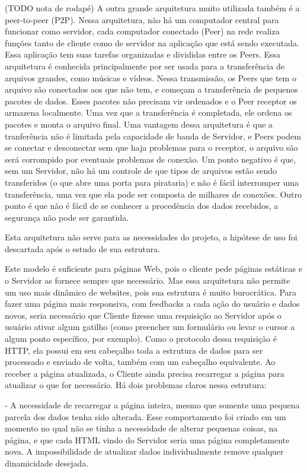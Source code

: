 \documentclass[a4paper,12pt]{article}
\begin{document}
(TODO nota de rodapé)
A outra grande arquitetura muito utilizada também é a peer-to-peer (P2P). Nessa arquitetura, não há um computador central para funcionar como servidor, cada computador conectado (Peer) na rede realiza funções tanto de cliente como de servidor na aplicação que está sendo executada. Essa aplicação tem suas tarefas organizadas e divididas entre os Peers.
Essa arquitetura é conhecida principalmente por ser usada para a transferência de arquivos grandes, como músicas e vídeos. Nessa transmissão, os Peers que tem o arquivo são conectados aos que não tem, e começam a transferência de pequenos pacotes de dados. Esses pacotes não precisam vir ordenados e o Peer receptor os armazena localmente. Uma vez que a transferência é completada, ele ordena os pacotes e monta o arquivo final. Uma vantagem dessa arquitetura é que a tranferência não é limitada pela capacidade de banda de Servidor, e Peers podem se conectar e desconectar sem que haja problemas para o receptor, o arquivo são será corrompido por eventuais problemas de conexão. Um ponto negativo é que, sem um Servidor, não há um controle de que tipos de arquivos estão sendo transferidos (o que abre uma porta para pirataria) e não é fácil interromper uma transferência, uma vez que ela pode ser composta de milhares de conexões. Outro ponto é que não é fácil de se conhecer a procedência dos dados recebidos, a segurança não pode ser garantida.

Esta arquitetura não serve para as necessidades do projeto, a hipótese de uso foi descartada após o estudo de sua estrutura.

Este modelo é suficiente para páginas Web, pois o cliente pede páginas estáticas e o Servidor as fornece sempre que necessário. Mas essa arquitetura não permite um uso mais dinâmico de websites, pois sua estrutura é muito burocrática. Para fazer uma página mais responsiva, com feedbacks a cada ação do usuário e dados novos, seria necessário que Cliente fizesse uma requisição ao Servidor após o usuário ativar algum gatilho (como preencher um formulário ou levar o cursor a algum ponto específico, por exemplo). Como o protocolo dessa requisição é HTTP, ela possui em seu cabeçalho toda a estrutura de dados para ser processado e enviado de volta, também com um cabeçalho equivalente. Ao receber a página atualizada, o Cliente ainda precisa recarregar a página para atualizar o que for necessário. Há dois problemas claros nessa estrutura:

- A necessidade de recarregar a página inteira, mesmo que somente uma pequena parcela dos dados tenha sido alterada. Esse comportamento foi criado em um momento no qual não se tinha a necessidade de alterar pequenas coisas, na página, e que cada HTML vindo do Servidor seria uma página completamente nova. A impossibilidade de atualizar dados individualmente remove qualquer dinamicidade desejada.
\end{document}
